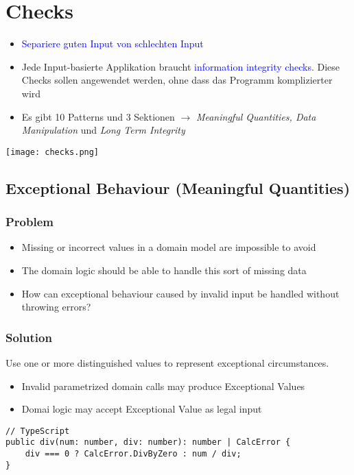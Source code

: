 \section{Checks}

\begin{itemize}
    \item \textcolor{blue}{Separiere guten Input von schlechten Input}
    \item Jede Input-basierte Applikation braucht \textcolor{blue}{information integrity checks}. Diese Checks sollen angewendet werden, ohne dass das Programm komplizierter wird
    \item Es gibt 10 Patterns und 3 Sektionen $\rightarrow$ \textit{Meaningful Quantities, Data Manipulation} und \textit{Long Term Integrity}
\end{itemize}

\texttt{[image: checks.png]}

\subsection{Exceptional Behaviour (Meaningful Quantities)}
\subsubsection{Problem}
\begin{itemize}
    \item Missing or incorrect values in a domain model are impossible to avoid
    \item The domain logic should be able to handle this sort of missing data
    \item How can exceptional behaviour caused by invalid input be handled without throwing errors?
\end{itemize}
\subsubsection{Solution}
Use one or more distinguished values to represent exceptional circumstances.
\begin{itemize}
    \item Invalid parametrized domain calls may produce Exceptional Values
    \item Domai logic may accept Exceptional Value as legal input
\end{itemize}
\begin{lstlisting}
// TypeScript
public div(num: number, div: number): number | CalcError {
    div === 0 ? CalcError.DivByZero : num / div;
}
\end{lstlisting}






